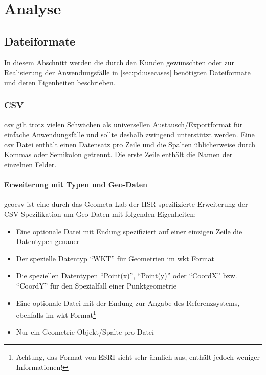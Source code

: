 \chapter{Analyse}


\section{Dateiformate}

In diesem Abschnitt werden die durch den Kunden gewünschten oder zur Realisierung der Anwendungsfälle in \cref{sec:pd:usecases} benötigten Dateiformate und deren Eigenheiten beschrieben.

\subsection{CSV}
\acf{csv} gilt trotz vielen Schwächen als universellen Austausch/Exportformat für einfache Anwendungsfälle und sollte deshalb zwingend unterstützt werden. Eine \acs{csv} Datei enthält einen Datensatz pro Zeile und die Spalten üblicherweise durch Kommas oder Semikolon getrennt. Die erste Zeile enthält die Namen der einzelnen Felder.

\subsubsection{Erweiterung mit Typen und Geo-Daten}

\gls{geocsv} ist eine durch das Geometa-Lab der HSR spezifizierte Erweiterung der CSV Spezifikation um Geo-Daten mit folgenden Eigenheiten\cite{sfkeller,geocsv,gdal-csv}:

\begin{itemize}
\item Eine optionale Datei mit Endung  spezifiziert auf einer einzigen Zeile die Datentypen genauer
\item Der spezielle Datentyp ``WKT'' für Geometrien im \gls{wkt} Format
\item Die speziellen Datentypen ``Point(x)'', ``Point(y)'' oder ``CoordX'' bzw. ``CoordY'' für den Spezialfall einer Punktgeometrie
\item Eine optionale Datei mit der Endung  zur Angabe des Referenzsystems, ebenfalls im \gls{wkt} Format\footnote{Achtung, das  Format von ESRI sieht sehr ähnlich aus, enthält jedoch weniger Informationen!}
\item Nur ein Geometrie-Objekt/Spalte pro Datei
\end{itemize}


